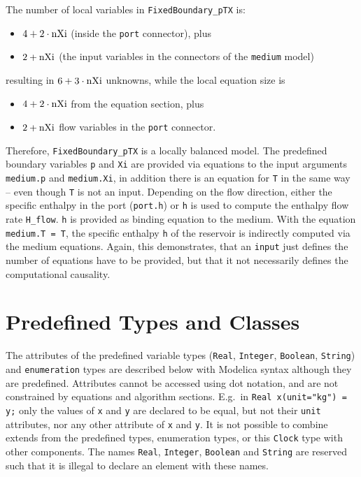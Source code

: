 \begin{example}
The number of local variables in \lstinline!FixedBoundary_pTX! is:
\begin{itemize}
\item
  $4 + 2 \cdot \text{\lstinline!nXi!}$ (inside the \lstinline!port! connector), plus
\item
  $2 + \text{\lstinline!nXi!}$ (the input variables in the connectors of the \lstinline!medium! model)
\end{itemize}
resulting in $6 + 3 \cdot \text{\lstinline!nXi!}$ unknowns, while the local equation size is
\begin{itemize}
\item
  $4 + 2 \cdot \text{\lstinline!nXi!}$ from the equation section, plus
\item
  $2 + \text{\lstinline!nXi!}$ flow variables in the \lstinline!port! connector.
\end{itemize}

Therefore, \lstinline!FixedBoundary_pTX! is a locally balanced model.  The predefined boundary variables \lstinline!p! and \lstinline!Xi! are
provided via equations to the input arguments \lstinline!medium.p! and \lstinline!medium.Xi!, in addition there is an equation for \lstinline!T!
in the same way -- even though \lstinline!T! is not an input.  Depending on the flow direction, either the specific enthalpy in the port
(\lstinline!port.h!) or \lstinline!h! is used to compute the enthalpy flow rate \lstinline!H_flow!.  \lstinline!h! is provided as binding equation
to the medium.  With the equation \lstinline!medium.T = T!, the specific enthalpy \lstinline!h! of the reservoir is indirectly computed via the
medium equations.  Again, this demonstrates, that an \lstinline!input! just defines the number of equations have to be provided, but that it not
necessarily defines the computational causality.
\end{example}

\section{Predefined Types and Classes}\label{predefined-types-and-classes}

The attributes of the predefined variable types (\lstinline!Real!, \lstinline!Integer!, \lstinline!Boolean!,
\lstinline!String!) and \lstinline!enumeration! types are described below with Modelica syntax
although they are predefined. Attributes cannot be accessed using dot
notation, and are not constrained by equations and algorithm sections.
E.g.\ in \lstinline!Real x(unit="kg") = y;! only the values of \lstinline!x! and \lstinline!y! are declared
to be equal, but not their \lstinline!unit! attributes, nor any other attribute of \lstinline!x!
and \lstinline!y!. It is not possible to combine extends from the predefined types,
enumeration types, or this \lstinline!Clock! type with other components. The names
\lstinline!Real!, \lstinline!Integer!, \lstinline!Boolean! and \lstinline!String! are reserved such that it is illegal
to declare an element with these names.

